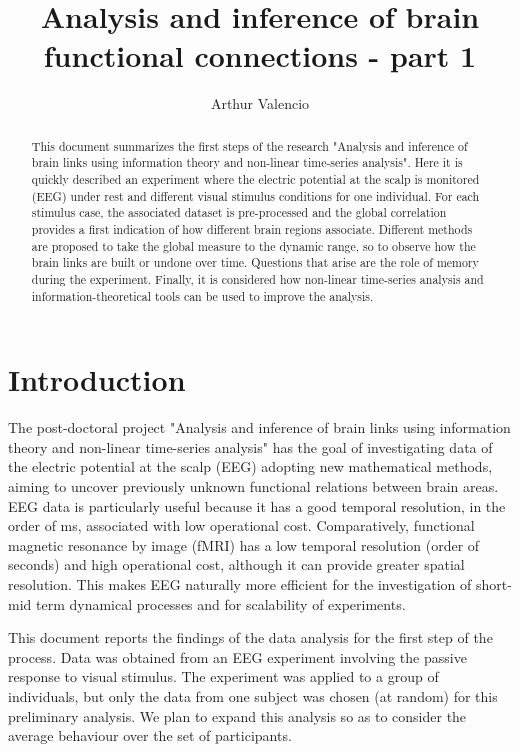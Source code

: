 \documentclass[a4paper]{article}
\title{Analysis and inference of brain functional connections - part 1}
\author{Arthur Valencio}
\begin{document}
\maketitle

\begin{abstract}
This document summarizes the first steps of the research "Analysis and inference of brain links using information theory and non-linear time-series analysis". Here it is quickly described an experiment where the electric potential at the scalp is monitored (EEG) under rest and different visual stimulus conditions for one individual. For each stimulus case, the associated dataset is pre-processed and the global correlation provides a first indication of how different brain regions associate. Different methods are proposed to take the global measure to the dynamic range, so to observe how the brain links are built or undone over time. Questions that arise are the role of memory during the experiment. Finally, it is considered how non-linear time-series analysis and information-theoretical tools can be used to improve the analysis.
\end{abstract}

\section{Introduction}

The post-doctoral project "Analysis and inference of brain links using information theory and non-linear time-series analysis" has the goal of investigating data of the electric potential at the scalp (EEG) adopting new mathematical methods, aiming to uncover previously unknown functional relations between brain areas. EEG data is particularly useful because it has a good temporal resolution, in the order of ms, associated with low operational cost. Comparatively, functional magnetic resonance by image (fMRI) has a low temporal resolution (order of seconds) and high operational cost, although it can provide greater spatial resolution. This makes EEG naturally more efficient for the investigation of short-mid term dynamical processes and for scalability of experiments.

This document reports the findings of the data analysis for the first step of the process. Data was obtained from an EEG experiment involving the passive response to visual stimulus. The experiment was applied to a group of individuals, but only the data from one subject was chosen (at random) for this preliminary analysis. We plan to expand this analysis so as to consider the average behaviour over the set of participants.
\end{document}

